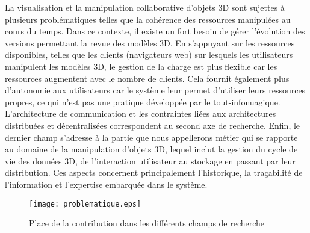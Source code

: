 La visualisation et la manipulation collaborative d'objets \gls{3D} sont sujettes à 
plusieurs problématiques telles que la cohérence des ressources manipulées au 
cours du temps. Dans ce contexte, il existe un fort besoin de gérer l'évolution des 
versions permettant la revue des modèles \gls{3D}. 
En s'appuyant sur les ressources disponibles, telles que les clients (navigateurs 
web) sur lesquels les utilisateurs manipulent les modèles \gls{3D}, le gestion de la charge est 
plus flexible car les ressources augmentent avec le nombre de clients.
Cela fournit également plus d'autonomie aux utilisateurs car le système leur permet d'utiliser
leurs ressources propres, ce qui n'est pas une pratique développée par le tout-infonuagique.
L'architecture de communication et les contraintes liées aux architectures 
distribuées et décentralisées correspondent au second axe de recherche. 
Enfin, le dernier champ 
s'adresse à la partie que nous appellerons \og métier\fg{} qui se rapporte au 
domaine de la manipulation d'objets \gls{3D}, lequel inclut la 
gestion du cycle de vie des données \gls{3D}, de l'interaction utilisateur au 
stockage 
en passant par leur distribution. Ces aspects concernent principalement
l'historique, la traçabilité de l'information et l'expertise embarquée dans le système.

\begin{figure}[hbt]
	\centering
	\texttt{[image: problematique.eps]}
	\caption{Place de la contribution dans les différents champs de recherche}
	\label{fig:problematique}
\end{figure}

